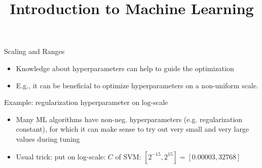 \documentclass[11pt,compress,t,notes=noshow, xcolor=table]{beamer}
\title{Introduction to Machine Learning}
\institute{\href{https://compstat-lmu.github.io/lecture_i2ml/}{compstat-lmu.github.io/lecture\_i2ml}}
\date{}
\begin{document}





\sloppy

\begin{frame}[allowframebreaks]{Scaling and Ranges}

\begin{itemize}
	\item Knowledge about hyperparameters can help to guide the optimization
	\item E.g., it can be beneficial to optimize hyperparameters on a non-uniform scale.
\end{itemize}

Example: regularization hyperparameter on log-scale

\begin{itemize}
    \item Many ML algorithms have non-neg. hyperparameters (e.g. regularization constant), for which it can make sense to try out very small and very large values during tuning 
    \item Usual trick: put on log-scale: $C$ of SVM: $[2^{-15}, 2^{15}] = [0.00003, 32768]$
\end{itemize}


\end{frame}
\end{document}
